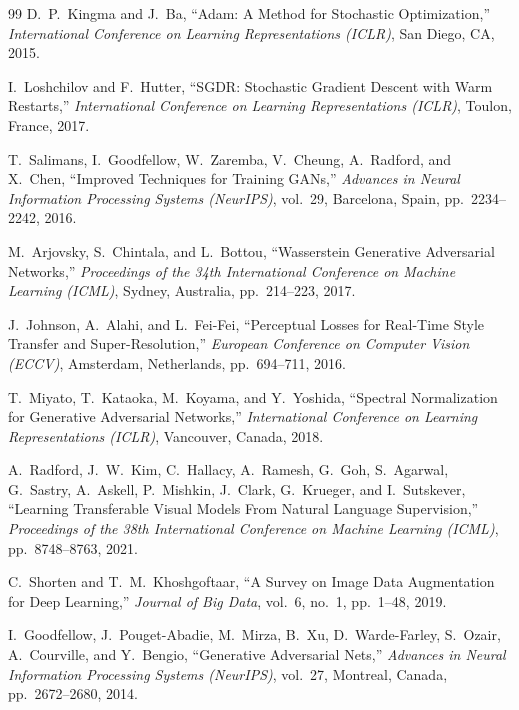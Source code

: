\documentclass[12pt,letterpaper]{article}
\begin{document}
\begin{thebibliography}{99}
D.~P.~Kingma and J.~Ba,
``Adam: A Method for Stochastic Optimization,''
\textit{International Conference on Learning Representations (ICLR)},
San Diego, CA, 2015.

I.~Loshchilov and F.~Hutter,
``SGDR: Stochastic Gradient Descent with Warm Restarts,''
\textit{International Conference on Learning Representations (ICLR)},
Toulon, France, 2017.

T.~Salimans, I.~Goodfellow, W.~Zaremba, V.~Cheung, A.~Radford, and X.~Chen,
``Improved Techniques for Training GANs,''
\textit{Advances in Neural Information Processing Systems (NeurIPS)},
vol.~29, Barcelona, Spain, pp.~2234--2242, 2016.

M.~Arjovsky, S.~Chintala, and L.~Bottou,
``Wasserstein Generative Adversarial Networks,''
\textit{Proceedings of the 34th International Conference on Machine Learning
(ICML)}, Sydney, Australia, pp.~214--223, 2017.

J.~Johnson, A.~Alahi, and L.~Fei-Fei,
``Perceptual Losses for Real-Time Style Transfer and Super-Resolution,''
\textit{European Conference on Computer Vision (ECCV)},
Amsterdam, Netherlands, pp.~694--711, 2016.

T.~Miyato, T.~Kataoka, M.~Koyama, and Y.~Yoshida,
``Spectral Normalization for Generative Adversarial Networks,''
\textit{International Conference on Learning Representations (ICLR)},
Vancouver, Canada, 2018.

A.~Radford, J.~W.~Kim, C.~Hallacy, A.~Ramesh, G.~Goh, S.~Agarwal,
G.~Sastry, A.~Askell, P.~Mishkin, J.~Clark, G.~Krueger, and I.~Sutskever,
``Learning Transferable Visual Models From Natural Language Supervision,''
\textit{Proceedings of the 38th International Conference on Machine Learning
(ICML)}, pp.~8748--8763, 2021.

C.~Shorten and T.~M.~Khoshgoftaar,
``A Survey on Image Data Augmentation for Deep Learning,''
\textit{Journal of Big Data}, vol.~6, no.~1, pp.~1--48, 2019.

I.~Goodfellow, J.~Pouget-Abadie, M.~Mirza, B.~Xu, D.~Warde-Farley,
S.~Ozair, A.~Courville, and Y.~Bengio,
``Generative Adversarial Nets,''
\textit{Advances in Neural Information Processing Systems (NeurIPS)},
vol.~27, Montreal, Canada, pp.~2672--2680, 2014.

\end{thebibliography}
\end{document}
